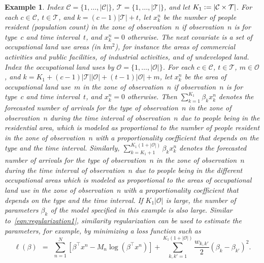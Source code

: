 \documentclass[article]{jss}
\newtheorem{example}{Example}[section]
\def\defi{\vcentcolon=}
\begin{document}
\begin{example}
\label{excov1}
Index $\mathcal{C} = \{1,\ldots,|\mathcal{C}|\}$, $\mathcal{T} = \{1,\ldots,|\mathcal{T}|\}$, and let $K_{1} \defi |\mathcal{C} \times \mathcal{T}|$.
For each $c \in \mathcal{C}$, $t \in \mathcal{T}$, and $k = (c - 1)|\mathcal{T}| + t$, let $x^{n}_{k}$ be the number of people resident (population count) in the zone of observation~$n$ if observation~$n$ is for type~$c$ and time interval~$t$, and $x^{n}_{k} = 0$ otherwise.
The next covariate is a set of occupational land use areas (in km$^2$), for instance the areas of commercial activities and public facilities, of industrial activities, and of undeveloped land.
Index the occupational land uses by $\mathcal{O} = \{1,\ldots,|\mathcal{O}|\}$.
For each $c \in \mathcal{C}$, $t \in \mathcal{T}$, $m \in \mathcal{O}$, and $k = K_{1} + (c - 1) |\mathcal{T}| |\mathcal{O}| + (t-1) |\mathcal{O}| + m$, let $x^{n}_{k}$ be the area of occupational land use~$m$ in the zone of observation~$n$ if observation~$n$ is for type~$c$ and time interval~$t$, and $x^{n}_{k} = 0$ otherwise.
Then $\sum_{k=1}^{K_{1}} \beta_{k} x^{n}_{k}$ denotes the forecasted number of arrivals for the type of observation~$n$ in the zone of observation~$n$ during the time interval of observation~$n$ due to people being in the residential area, which is modeled as proportional to the number of people resident in the zone of observation~$n$ with a proportionality coefficient that depends on the type and the time interval.
Similarly, $\sum_{k = K_{1} + 1}^{K_{1}(1+|\mathcal{O}|)} \beta_{k} x^{n}_{k}$ denotes the forecasted number of arrivals for the type of observation~$n$ in the zone of observation~$n$ during the time interval of observation~$n$ due to people being in the different occupational areas which is modeled as proportional to the areas of occupational land use in the zone of observation~$n$ with a proportionality coefficient that depends on the type and the time interval.
If $K_{1} |\mathcal{O}|$ is large, the number of parameters $\beta_{k}$ of the model specified in this example is also large.
Similar to~\eqref{eqn:regularization1}, similarity regularization can be used to estimate the parameters, for example, by minimizing a loss function such as
\[
\ell(\beta) \ \ = \ \ \sum_{n=1}^{N} \left[\beta^{\top} x^{n} - M_{n} \log\left(\beta^{\top} x^{n}\right)\right] + \sum_{k,k'=1}^{K_{1}(1+|\mathcal{O}|)} \frac{w_{k,k'}}{2} \left(\beta_{k} - \beta_{k'}\right)^2.
\]
\end{example}
\end{document}
